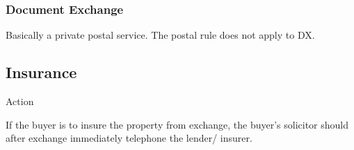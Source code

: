 \documentclass[
]{article}
\newenvironment{env-a1c35d52-c355-4524-93c6-325e9133bd60}
{
    \savenotes\tcolorbox[blanker,breakable,left=5pt,borderline west={2pt}{-4pt}{aquamarine}]
}
{
    \endtcolorbox\spewnotes
}
\begin{document}
\hypertarget{document-exchange}{%
\subsubsection{Document Exchange}\label{document-exchange}}

Basically a private postal service. The postal rule does not apply to
DX.

\hypertarget{insurance-2}{%
\subsection{Insurance}\label{insurance-2}}

\begin{env-a1c35d52-c355-4524-93c6-325e9133bd60}

Action

If the buyer is to insure the property from exchange, the buyer's
solicitor should after exchange immediately telephone the lender/
insurer.

\end{env-a1c35d52-c355-4524-93c6-325e9133bd60}
\end{document}
